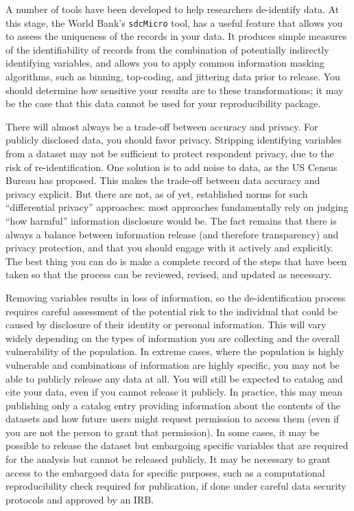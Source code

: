 A number of tools have been developed to help researchers de-identify data.
At this stage, the World Bank's \texttt{sdcMicro} tool,
has a useful feature
that allows you to assess the uniqueness of the records in your data.
It produces simple measures of the identifiability of records from
the combination of potentially indirectly identifying variables,
and allows you to apply common information masking algorithms,
such as binning, top-coding, and jittering data prior to release.
You should determine how sensitive your results are to these transformations;
it may be the case that this data cannot be used for your reproducibility package.

There will almost always be a trade-off between accuracy and privacy.
For publicly disclosed data, you should favor privacy.
Stripping identifying variables from a dataset may not be sufficient to protect respondent privacy,
due to the risk of re-identification.
One solution is to add noise to data, as the US Census Bureau has proposed.\cite{abowd2018us}
This makes the trade-off between data accuracy and privacy explicit.
But there are not, as of yet, established norms for such ``differential privacy'' approaches:
most approaches fundamentally rely on judging ``how harmful'' information disclosure would be.
The fact remains that there is always a balance between information release (and therefore transparency)
and privacy protection, and that you should engage with it actively and explicitly.
The best thing you can do is make a complete record of the steps that have been taken
so that the process can be reviewed, revised, and updated as necessary.

Removing variables results in loss of information, so the de-identification process
requires careful assessment of the potential risk to the individual
that could be caused by disclosure of their identity or personal information.
This will vary widely depending on the types of information
you are collecting and the overall vulnerability of the population.
In extreme cases, where the population is highly vulnerable
and combinations of information are highly specific,
you may not be able to publicly release any data at all.
You will still be expected to catalog and cite your data,
even if you cannot release it publicly.
In practice, this may mean publishing only a catalog entry
providing information about the contents of the datasets
and how future users might request permission to access them
(even if you are not the person to grant that permission).
In some cases, it may be possible to release the dataset but
embargoing specific variables that are required for the analysis but cannot be released publicly.
It may be necessary to grant access to the embargoed data for specific purposes,
such as a computational reproducibility check required for publication,
if done under careful data security protocols and approved by an IRB.

